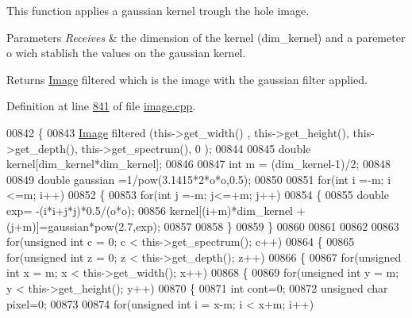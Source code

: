 This function applies a gaussian kernel trough the hole image. 


\begin{DoxyParams}{Parameters}
{\em Receives} & the dimension of the kernel (dim\-\_\-kernel) and a paremeter o wich stablish the values on the gaussian kernel. \\
\hline
\end{DoxyParams}
\begin{DoxyReturn}{Returns}
\hyperlink{class_image}{Image} filtered which is the image with the gaussian filter applied. 
\end{DoxyReturn}


Definition at line \hyperlink{image_8cpp_source_l00841}{841} of file \hyperlink{image_8cpp_source}{image.\-cpp}.


\begin{DoxyCode}
00842 \{
00843     \hyperlink{class_image}{Image} filtered (this->get\_width() , this->get\_height(), this->get\_depth(), this->get\_spectrum(), 0
      );
00844 
00845     \textcolor{keywordtype}{double} kernel[dim\_kernel*dim\_kernel];
00846     
00847     \textcolor{keywordtype}{int} m = (dim\_kernel-1)/2;
00848     
00849     \textcolor{keywordtype}{double} gaussian =1/pow(3.1415*2*o*o,0.5);
00850 
00851     \textcolor{keywordflow}{for}(\textcolor{keywordtype}{int} i =-m; i <=m; i++)
00852     \{
00853         \textcolor{keywordflow}{for}(\textcolor{keywordtype}{int} j =-m; j<=+m; j++)
00854         \{
00855             \textcolor{keywordtype}{double} exp= -(i*i+j*j)*0.5/(o*o);
00856             kernel[(i+m)*dim\_kernel + (j+m)]=gaussian*pow(2.7,exp); 
00857             
00858         \}
00859     \}
00860     
00861     
00862     
00863     \textcolor{keywordflow}{for}(\textcolor{keywordtype}{unsigned} \textcolor{keywordtype}{int} c = 0; c < this->get\_spectrum(); c++)
00864     \{
00865         \textcolor{keywordflow}{for}(\textcolor{keywordtype}{unsigned} \textcolor{keywordtype}{int} z = 0; z < this->get\_depth(); z++)
00866         \{
00867             \textcolor{keywordflow}{for}(\textcolor{keywordtype}{unsigned} \textcolor{keywordtype}{int} x = m; x < this->get\_width(); x++)
00868             \{
00869                 \textcolor{keywordflow}{for}(\textcolor{keywordtype}{unsigned} \textcolor{keywordtype}{int} y = m; y < this->get\_height(); y++)
00870                 \{
00871                     \textcolor{keywordtype}{int} cont=0;
00872                     \textcolor{keywordtype}{unsigned} \textcolor{keywordtype}{char} pixel=0;
00873                     
00874                     \textcolor{keywordflow}{for}(\textcolor{keywordtype}{unsigned} \textcolor{keywordtype}{int} i = x-m; i < x+m; i++)

\end{DoxyCode}
